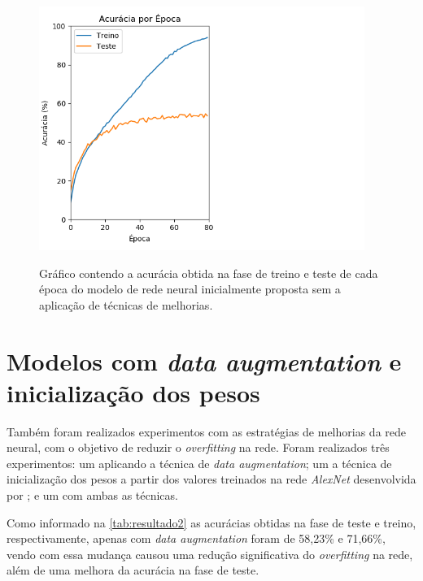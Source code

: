

\begin{figure}[H]
  \centering
  \caption{Gráfico contendo a acurácia obtida na fase de treino e teste de cada época do modelo de rede neural inicialmente proposta sem a aplicação de técnicas de melhorias.}
  \includegraphics[width=300pt]{dados/figuras/resultado1}
  \label{fig:resultado1}
\end{figure}

\section{Modelos com \textit{data augmentation} e inicialização dos pesos}
Também foram realizados experimentos com as estratégias de melhorias da rede neural, com o objetivo de reduzir o \textit{overfitting} na rede. Foram realizados três experimentos: um aplicando a técnica de \textit{data augmentation}; um a técnica de inicialização dos pesos a partir dos valores treinados na rede \textit{AlexNet} desenvolvida por ; e um com ambas as técnicas. 

\par Como informado na \autoref{tab:resultado2} as acurácias obtidas na fase de teste e treino, respectivamente, apenas com \textit{data augmentation} foram de 58,23\% e 71,66\%, vendo com essa mudança causou uma redução significativa do \textit{overfitting} na rede, além de uma melhora da acurácia na fase de teste.



